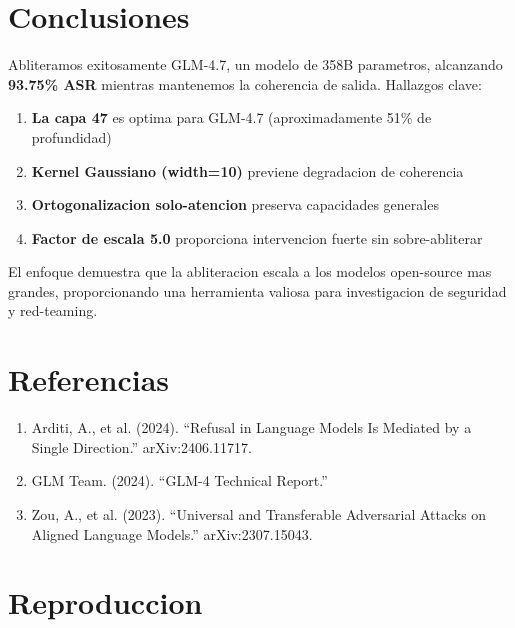 \documentclass[11pt,a4paper]{article}
\begin{document}
\section{Conclusiones}

Abliteramos exitosamente GLM-4.7, un modelo de 358B parametros, alcanzando \textbf{93.75\% ASR} mientras mantenemos la coherencia de salida. Hallazgos clave:

\begin{enumerate}
    \item \textbf{La capa 47} es optima para GLM-4.7 (aproximadamente 51\% de profundidad)
    \item \textbf{Kernel Gaussiano (width=10)} previene degradacion de coherencia
    \item \textbf{Ortogonalizacion solo-atencion} preserva capacidades generales
    \item \textbf{Factor de escala 5.0} proporciona intervencion fuerte sin sobre-abliterar
\end{enumerate}

El enfoque demuestra que la abliteracion escala a los modelos open-source mas grandes, proporcionando una herramienta valiosa para investigacion de seguridad y red-teaming.

\section{Referencias}

\begin{enumerate}
    \item Arditi, A., et al. (2024). ``Refusal in Language Models Is Mediated by a Single Direction.'' arXiv:2406.11717.
    \item GLM Team. (2024). ``GLM-4 Technical Report.''
    \item Zou, A., et al. (2023). ``Universal and Transferable Adversarial Attacks on Aligned Language Models.'' arXiv:2307.15043.
\end{enumerate}

\appendix
\section{Reproduccion}
\end{document}
